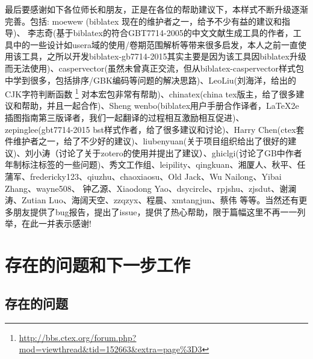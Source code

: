 最后要感谢如下各位师长和朋友，正是在各位的帮助建议下，本样式不断升级逐渐完善。包括: moewew (biblatex 现在的维护者之一，给予不少有益的建议和指导)、 李志奇(基于biblatex的符合GBT7714-2005的中文文献生成工具的作者，工具中的一些设计如usera域的使用/卷期范围解析等带来很多启发，本人之前一直使用该工具，之所以开发biblatex-gb7714-2015其实主要是因为该工具因biblatex升级而无法使用)、caspervector(虽然未曾真正交流，但从biblatex-caspervector样式包中学到很多，包括排序/GBK编码等问题的解决思路)、LeoLiu(刘海洋，给出的CJK字符判断函数
\footnote{\url{http://bbs.ctex.org/forum.php?mod=viewthread&tid=152663&extra=page\%3D3}} 对本宏包非常有帮助)、chinatex(china tex版主，给了很多建议和帮助，并且一起合作)、Sheng wenbo(biblatex用户手册合作译者，LaTeX2e 插图指南第三版译者，我们一起翻译的过程相互激励相互促进)、zepinglee(gbt7714-2015 bst样式作者，给了很多建议和讨论)、Harry Chen(ctex套件维护者之一，给了不少好的建议)、liubenyuan(关于项目组织给出了很好的建议)、刘小涛（讨论了关于zotero的使用并提出了建议）、ghiclgi(讨论了GB中作者年制标注标签的一些问题)、秀文工作组、leipility、qingkuan、湘厦人、秋平、任蒲军、fredericky123、qiuzhu、chaoxiaosu、Old Jack、Wu Nailong、Yibai Zhang、wayne508、 钟乙源、Xiaodong Yao、dsycircle、rpjshu、zjsdut、谢澜涛、Zutian Luo、海阔天空、zzqzyx、程晨、xmtangjun、蔡伟 等等。当然还有更多朋友提供了bug报告，提出了issue，提供了热心帮助，限于篇幅这里不再一一列举，在此一并表示感谢!


\section{存在的问题和下一步工作}


\subsection{存在的问题}

